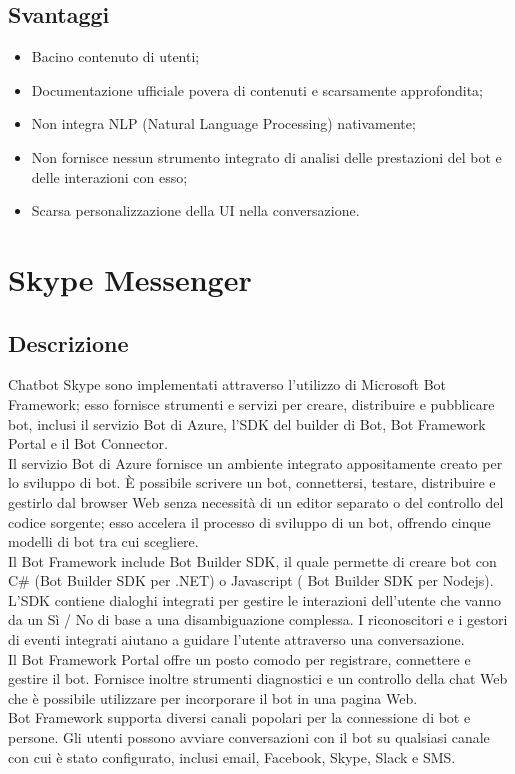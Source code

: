\documentclass[11pt,notitlepage]{article}
\begin{document}
\subsection*{Svantaggi}
\begin{itemize}
		\item Bacino contenuto di utenti;
		\item Documentazione ufficiale povera di contenuti e scarsamente approfondita; 
		\item Non integra NLP (Natural Language Processing) nativamente;
		\item Non fornisce nessun strumento integrato di analisi delle prestazioni del bot e delle interazioni con esso;
		\item Scarsa personalizzazione della UI nella conversazione.
\end{itemize} 

\bigskip
\section*{Skype Messenger}
\subsection*{Descrizione}
Chatbot Skype sono implementati attraverso l'utilizzo di Microsoft Bot Framework; esso fornisce strumenti e servizi per creare, distribuire e pubblicare bot, inclusi il servizio Bot di Azure, l'SDK del builder di Bot, Bot Framework Portal e il Bot Connector. \\
Il servizio Bot di Azure fornisce un ambiente integrato appositamente creato per lo sviluppo di bot. È possibile scrivere un bot, connettersi, testare, distribuire e gestirlo dal browser Web senza necessità di un editor separato o del controllo del codice sorgente; esso accelera il processo di sviluppo di un bot, offrendo cinque modelli di bot tra cui scegliere.  \\
Il Bot Framework include Bot Builder SDK, il quale permette di creare bot con C\# (Bot Builder SDK per .NET) o Javascript ( Bot Builder SDK per Nodejs). L'SDK contiene dialoghi integrati per gestire le interazioni dell'utente che vanno da un Sì / No di base a una disambiguazione complessa. I riconoscitori e i gestori di eventi integrati aiutano a guidare l'utente attraverso una conversazione. \\
Il Bot Framework Portal offre un posto comodo per registrare, connettere e gestire il bot. Fornisce inoltre strumenti diagnostici e un controllo della chat Web che è possibile utilizzare per incorporare il bot in una pagina Web. \\
Bot Framework supporta diversi canali popolari per la connessione di bot e persone. Gli utenti possono avviare conversazioni con il bot su qualsiasi canale con cui è stato configurato, inclusi email, Facebook, Skype, Slack e SMS. 
\end{document}
